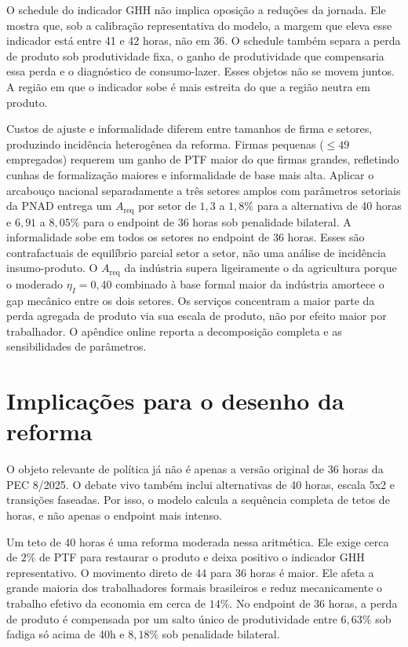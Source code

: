 \documentclass[10pt,twocolumn]{article}
\begin{document}
O schedule do indicador GHH n\~ao implica oposi\c{c}\~ao a redu\c{c}\~oes da jornada. Ele mostra que, sob a calibra\c{c}\~ao representativa do modelo, a margem que eleva esse indicador est\'a entre 41 e 42 horas, n\~ao em 36. O schedule tamb\'em separa a perda de produto sob produtividade fixa, o ganho de produtividade que compensaria essa perda e o diagn\'ostico de consumo-lazer. Esses objetos n\~ao se movem juntos. A regi\~ao em que o indicador sobe \'e mais estreita do que a regi\~ao neutra em produto.

Custos de ajuste e informalidade diferem entre tamanhos de firma e setores, produzindo incid\^encia heterog\^enea da reforma. Firmas pequenas ($\leq 49$ empregados) requerem um ganho de PTF maior do que firmas grandes, refletindo cunhas de formaliza\c{c}\~ao maiores e informalidade de base mais alta. Aplicar o arcabou\c{c}o nacional separadamente a tr\^es setores amplos com par\^ametros setoriais da PNAD entrega um $A_{\text{req}}$ por setor de $1{,}3$ a $1{,}8\%$ para a alternativa de 40 horas e $6{,}91$ a $8{,}05\%$ para o endpoint de 36 horas sob penalidade bilateral. A informalidade sobe em todos os setores no endpoint de 36 horas. Esses s\~ao contrafactuais de equil\'ibrio parcial setor a setor, n\~ao uma an\'alise de incid\^encia insumo-produto. O $A_{\text{req}}$ da ind\'ustria supera ligeiramente o da agricultura porque o moderado $\eta_I=0{,}40$ combinado \`a base formal maior da ind\'ustria amortece o gap mec\^anico entre os dois setores. Os servi\c{c}os concentram a maior parte da perda agregada de produto via sua escala de produto, n\~ao por efeito maior por trabalhador. O ap\^endice online reporta a decomposi\c{c}\~ao completa e as sensibilidades de par\^ametros.

\section{Implica\c{c}\~oes para o desenho da reforma}\label{sec:conclusion}

O objeto relevante de pol\'itica j\'a n\~ao \'e apenas a vers\~ao original de 36 horas da PEC 8/2025. O debate vivo tamb\'em inclui alternativas de 40 horas, escala 5x2 e transi\c{c}\~oes faseadas. Por isso, o modelo calcula a sequ\^encia completa de tetos de horas, e n\~ao apenas o endpoint mais intenso.

Um teto de 40 horas \'e uma reforma moderada nessa aritm\'etica. Ele exige cerca de $2\%$ de PTF para restaurar o produto e deixa positivo o indicador GHH representativo. O movimento direto de 44 para 36 horas \'e maior. Ele afeta a grande maioria dos trabalhadores formais brasileiros e reduz mecanicamente o trabalho efetivo da economia em cerca de $14\%$. No endpoint de 36 horas, a perda de produto \'e compensada por um salto \'unico de produtividade entre $6{,}63\%$ sob fadiga s\'o acima de 40h e $8{,}18\%$ sob penalidade bilateral.
\end{document}
